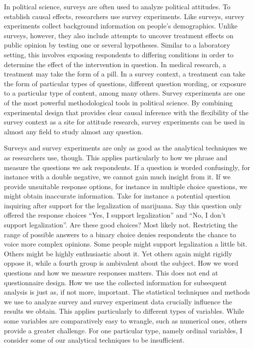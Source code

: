 \documentclass[12pt,econ]{sources/authesis}
\begin{document}
In political science, surveys are often used to analyze political attitudes. To establish causal effects, researchers use survey experiments. Like surveys, survey experiments collect background information on people's demographics. Unlike surveys, however, they also include attempts to uncover treatment effects on public opinion by testing one or several hypotheses. Similar to a laboratory setting, this involves exposing respondents to differing conditions in order to determine the effect of the intervention in question. In medical research, a treatment may take the form of a pill. In a survey context, a treatment can take the form of particular types of questions, different question wording, or exposure to a particular type of content, among many others. Survey experiments are one of the most powerful methodological tools in political science. By combining experimental design that provides clear causal inference with the flexibility of the survey context as a site for attitude research, survey experiments can be used in almost any field to study almost any question.

Surveys and survey experiments are only as good as the analytical techniques we as researchers use, though. This applies particularly to how we phrase and measure the questions we ask respondents. If a question is worded confusingly, for instance with a double negative, we cannot gain much insight from it. If we provide unsuitable response options, for instance in multiple choice questions, we might obtain inaccurate information. Take for instance a potential question inquiring after support for the legalization of marijuana. Say this question only offered the response choices ``Yes, I support legalization'' and ``No, I don't support legalization''. Are these good choices? Most likely not. Restricting the range of possible answers to a binary choice denies respondents the chance to voice more complex opinions. Some people might support legalization a little bit. Others might be highly enthusiastic about it. Yet others again might rigidly oppose it, while a fourth group is ambivalent about the subject. How we word questions and how we measure responses matters. This does not end at questionnaire design. How we use the collected information for subsequent analysis is just as, if not more, important. The statistical techniques and methods we use to analyze survey and survey experiment data crucially influence the results we obtain. This applies particularly to different types of variables. While some variables are comparatively easy to wrangle, such as numerical ones, others provide a greater challenge. For one particular type, namely ordinal variables, I consider some of our analytical techniques to be insufficient.
\end{document}
